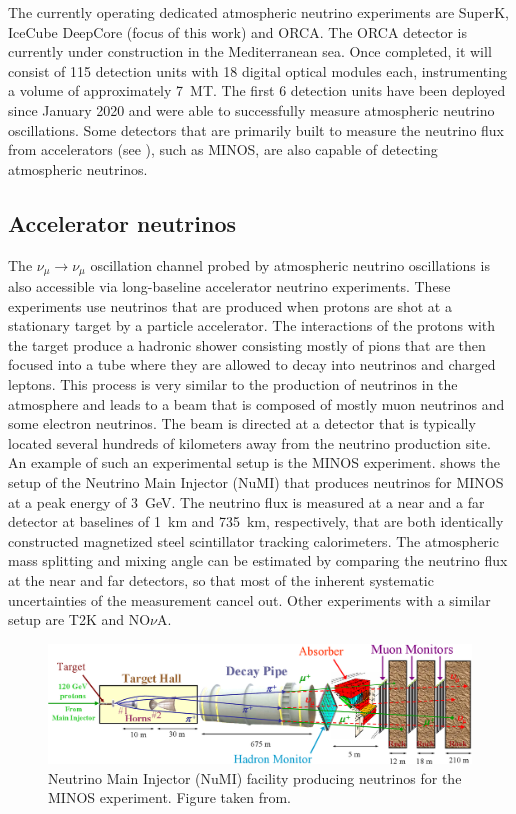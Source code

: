 The currently operating dedicated atmospheric neutrino experiments are SuperK, IceCube DeepCore (focus of this work) and ORCA\cite{km3net_2016}. The ORCA detector is currently under construction in the Mediterranean sea. Once completed, it will consist of 115 detection units with 18 digital optical modules each, instrumenting a volume of approximately \SI{7}{MT}. The first 6 detection units have been deployed since January 2020 and were able to successfully measure atmospheric neutrino oscillations\cite{Nauta:20213J}. Some detectors that are primarily built to measure the neutrino flux from accelerators (see ), such as MINOS, are also capable of detecting atmospheric neutrinos\cite{MINOS:2005iiy}.

\subsection{Accelerator neutrinos}
The $\nu_\mu \rightarrow \nu_\mu$ oscillation channel probed by atmospheric neutrino oscillations is also accessible via long-baseline accelerator neutrino experiments.
These experiments use neutrinos that are produced when protons are shot at a stationary target by a particle accelerator.
The interactions of the protons with the target produce a hadronic shower consisting mostly of pions that are then focused into a tube where they are allowed to decay into neutrinos and charged leptons.
This process is very similar to the production of neutrinos in the atmosphere and leads to a beam that is composed of mostly muon neutrinos and some electron neutrinos.
The beam is directed at a detector that is typically located several hundreds of kilometers away from the neutrino production site.
An example of such an experimental setup is the MINOS experiment\cite{MICHAEL2008190}.
 shows the setup of the Neutrino Main Injector (NuMI) that produces neutrinos for MINOS at a peak energy of \SI{3}{GeV}.
The neutrino flux is measured at a near and a far detector at baselines of \SI{1}{km} and \SI{735}{km}, respectively, that are both identically constructed magnetized steel scintillator tracking calorimeters.
The atmospheric mass splitting and mixing angle can be estimated by comparing the neutrino flux at the near and far detectors, so that most of the inherent systematic uncertainties of the measurement cancel out.
Other experiments with a similar setup are T2K\cite{T2K:2011qtm} and NO$\nu$A\cite{Patterson:2012zs}.
\begin{figure}
    \centering
    \includegraphics{figures/theory/numi_beam.png}
    \caption{Neutrino Main Injector (NuMI) facility producing neutrinos for the MINOS experiment. Figure taken from\cite{osti_879065}.\label{fig:numi-beam}}
\end{figure}

